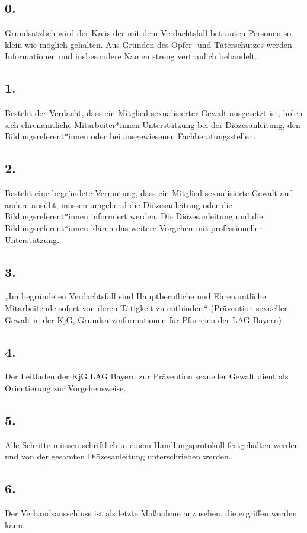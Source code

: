 \documentclass[12pt]{report}
\begin{document}
\begin{flushleft}
\subsection*{ 0.}
Grundsätzlich wird der Kreis der mit dem Verdachtsfall betrauten Personen so klein wie möglich gehalten.
Aus Gründen des Opfer- und Täterschutzes werden Informationen und insbesondere Namen 	
streng vertraulich behandelt.
\subsection*{1.}
Besteht der Verdacht, dass ein Mitglied sexualisierter Gewalt ausgesetzt ist, holen sich ehrenamtliche
Mitarbeiter*innen Unterstützung bei der Diözesanleitung, den Bildungsreferent*innen oder bei 	
ausgewiesenen Fachberatungsstellen.
\subsection*{2.}
Besteht eine begründete Vermutung, dass ein Mitglied sexualisierte Gewalt auf andere ausübt, müssen
umgehend die Diözesanleitung oder die Bildungsreferent*innen informiert werden. Die Diözesanleitung
und die Bildungsreferent*innen klären das weitere Vorgehen mit professioneller Unterstützung.
\subsection*{3.}
„Im begründeten Verdachtsfall sind Hauptberufliche und Ehrenamtliche Mitarbeitende sofort von 	
deren Tätigkeit zu entbinden.“
(Prävention sexueller Gewalt in der KjG, Grundsatzinformationen für Pfarreien der LAG Bayern)
\subsection*{4.}
Der Leitfaden der KjG LAG Bayern zur Prävention sexueller Gewalt dient als Orientierung zur Vorgehensweise.
\subsection*{5.}
Alle Schritte müssen schriftlich in einem Handlungsprotokoll festgehalten werden und von der gesamten
Diözesanleitung unterschrieben werden.
\subsection*{6.}
Der Verbandsausschluss ist als letzte Maßnahme anzusehen, die ergriffen werden kann.


\end{flushleft}
\end{document}
